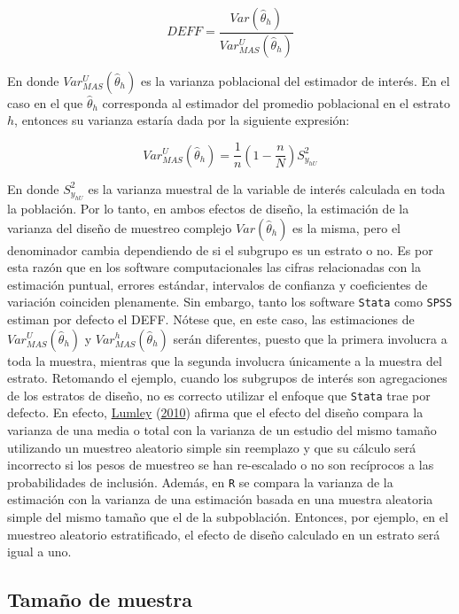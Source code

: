 \documentclass[
  12pt,
  spanish,
]{book}
\begin{document}
\[
DEFF= \frac{Var (\hat\theta_h) }{Var_{MAS}^U(\hat\theta_h) }
\]

En donde \(Var_{MAS}^U(\hat\theta_h)\) es la varianza poblacional del estimador de interés. En el caso en el que \(\hat\theta_h\) corresponda al estimador del promedio poblacional en el estrato \(h\), entonces su varianza estaría dada por la siguiente expresión:

\[
Var_{MAS}^U(\hat\theta_h)=\frac{1}{n}\left(1-\frac{n}{N}\right)S_{y_{hU}}^2
\]

En donde \(S_{y_{hU}}^2\) es la varianza muestral de la variable de interés calculada en toda la población. Por lo tanto, en ambos efectos de diseño, la estimación de la varianza del diseño de muestreo complejo \(Var (\hat\theta_h)\) es la misma, pero el denominador cambia dependiendo de si el subgrupo es un estrato o no. Es por esta razón que en los software computacionales las cifras relacionadas con la estimación puntual, errores estándar, intervalos de confianza y coeficientes de variación coinciden plenamente. Sin embargo, tanto los software \texttt{Stata} como \texttt{SPSS} estiman por defecto el DEFF. Nótese que, en este caso, las estimaciones de \(Var_{MAS}^U(\hat\theta_h)\) y \(Var_{MAS}^h(\hat\theta_h)\) serán diferentes, puesto que la primera involucra a toda la muestra, mientras que la segunda involucra únicamente a la muestra del estrato. Retomando el ejemplo, cuando los subgrupos de interés son agregaciones de los estratos de diseño, no es correcto utilizar el enfoque que \texttt{Stata} trae por defecto. En efecto, \protect\hyperlink{ref-Lumley_2010}{Lumley} (\protect\hyperlink{ref-Lumley_2010}{2010}) afirma que el efecto del diseño compara la varianza de una media o total con la varianza de un estudio del mismo tamaño utilizando un muestreo aleatorio simple sin reemplazo y que su cálculo será incorrecto si los pesos de muestreo se han re-escalado o no son recíprocos a las probabilidades de inclusión. Además, en \texttt{R} se compara la varianza de la estimación con la varianza de una estimación basada en una muestra aleatoria simple del mismo tamaño que el de la subpoblación. Entonces, por ejemplo, en el muestreo aleatorio estratificado, el efecto de diseño calculado en un estrato será igual a uno.

\hypertarget{tamauxf1o-de-muestra}{%
\subsection{Tamaño de muestra}\label{tamauxf1o-de-muestra}}
\end{document}
